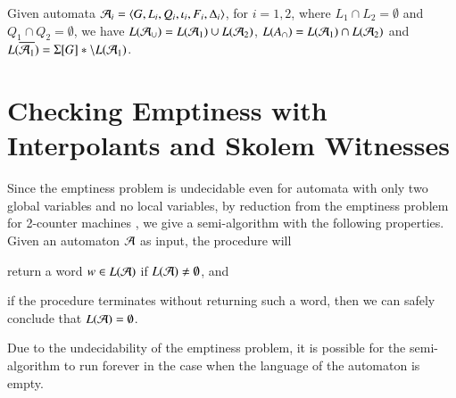 \documentclass{llncs}
\begin{document}
\begin{lemma}\label{lemma:boolean-closure}
  Given automata $\mathcal{A}_i = \langle G,L_i,Q_i,\iota_i,F_i,\Delta_i \rangle$, for
  $i=1,2$, where $L_1 \cap L_2 = \emptyset$ and $Q_1 \cap Q_2 =
  \emptyset$, we have $L(\mathcal{A}_\cup) = L(\mathcal{A}_1) \cup L(\mathcal{A}_2)$, $L(A_\cap)
  = L(\mathcal{A}_1) \cap L(\mathcal{A}_2)$ and $L(\overline{\mathcal{A}_1}) = \Sigma[G]*
  \setminus L(\mathcal{A}_1)$. 
\end{lemma}

\section{Checking Emptiness with Interpolants and Skolem Witnesses}

Since the emptiness problem is undecidable even for automata with only
two global variables and no local variables, by reduction from the
emptiness problem for 2-counter machines \cite{Minsky67}, we give a
semi-algorithm with the following properties. Given an automaton $\mathcal{A}$
as input, the procedure will\begin{inparaenum}[(1)] 
\item return a word $w \in L(\mathcal{A})$ if $L(\mathcal{A})
\neq \emptyset$, and 
%
\item if the procedure terminates without returning such a word, then
  we can safely conclude that $L(\mathcal{A}) = \emptyset$. \end{inparaenum}
Due to the undecidability of the emptiness problem, it is possible for
the semi-algorithm to run forever in the case when the language of the
automaton is empty.
\end{document}
